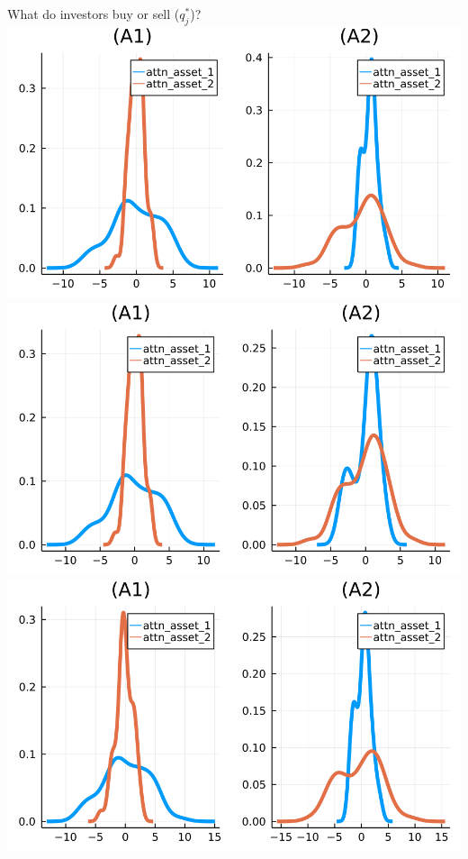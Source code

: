 \documentclass[
  ignorenonframetext,
]{beamer}
\begin{document}
\begin{frame}{What do investors buy or sell (\(q_j^*\))?}
\protect\hypertarget{what-do-investors-buy-or-sell-q_j}{}
\includegraphics[width=0.4\paperwidth]{complexity_files/figure-beamer/unnamed-chunk-18-1}
\includegraphics[width=0.4\paperwidth]{complexity_files/figure-beamer/unnamed-chunk-18-2}
\includegraphics[width=0.4\paperwidth]{complexity_files/figure-beamer/unnamed-chunk-18-3}

\end{frame}
\end{document}
